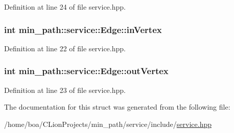 Definition at line 24 of file service.\+hpp.

\subsubsection[{\texorpdfstring{in\+Vertex}{inVertex}}]{\setlength{\rightskip}{0pt plus 5cm}int min\+\_\+path\+::service\+::\+Edge\+::in\+Vertex}\hypertarget{structmin__path_1_1service_1_1_edge_ae5f860082c48acb267ddf2bbed3d762e}{}\label{structmin__path_1_1service_1_1_edge_ae5f860082c48acb267ddf2bbed3d762e}


Definition at line 22 of file service.\+hpp.

\subsubsection[{\texorpdfstring{out\+Vertex}{outVertex}}]{\setlength{\rightskip}{0pt plus 5cm}int min\+\_\+path\+::service\+::\+Edge\+::out\+Vertex}\hypertarget{structmin__path_1_1service_1_1_edge_a7162f7cb4b4bfa81225f2a6be16b770a}{}\label{structmin__path_1_1service_1_1_edge_a7162f7cb4b4bfa81225f2a6be16b770a}


Definition at line 23 of file service.\+hpp.



The documentation for this struct was generated from the following file\+:\begin{DoxyCompactItemize}
\item 
/home/boa/\+C\+Lion\+Projects/min\+\_\+path/service/include/\hyperlink{service_8hpp}{service.\+hpp}\end{DoxyCompactItemize}
